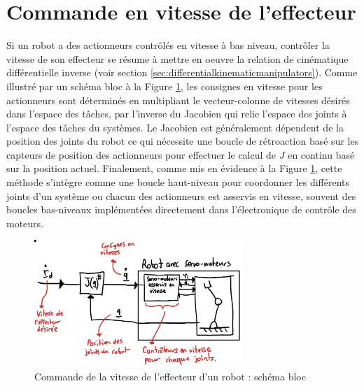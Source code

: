 \newpage
\section{Commande en vitesse de l'effecteur}
\label{sec:speedcontrol}

Si un robot a des actionneurs contrôlés en vitesse à bas niveau, contrôler la vitesse de son effecteur se résume à mettre en oeuvre la relation de cinématique différentielle inverse (voir section \ref{sec:differentialkinematicmanipulators}).  Comme illustré par un schéma bloc à la Figure \ref{fig:robotspeedcontrol}, les consignes en vitesse pour les actionneurs sont déterminés en multipliant le vecteur-colonne de vitesses désirés dans l'espace des tâches, par l'inverse du Jacobien qui relie l'espace des joints à l'espace des tâches du systèmes. Le Jacobien est généralement dépendent de la position des joints du robot ce qui nécessite une boucle de rétroaction basé sur les capteurs de position des actionneurs pour effectuer le calcul de $J$ en continu basé sur la position actuel. Finalement, comme mis en évidence à la Figure \ref{fig:robotspeedcontrol}, cette méthode s'intègre comme une boucle haut-niveau pour coordonner les différents joints d'un système ou chacun des actionneurs est asservis en vitesse, souvent des boucles bas-niveaux implémentées directement dans l'électronique de contrôle des moteurs. 
\begin{figure}[H]
	\centering
		\includegraphics[width=0.7\textwidth]{fig/robotspeedcontrol.jpg}
	\caption{Commande de la vitesse de l'effecteur d'un robot : schéma bloc}
	\label{fig:robotspeedcontrol}
\end{figure}

